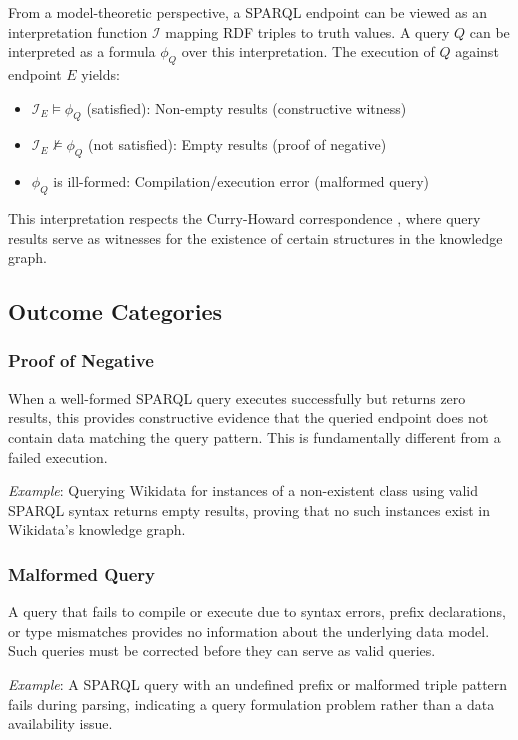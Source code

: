 From a model-theoretic perspective, a SPARQL endpoint can be viewed as an interpretation function $\mathcal{I}$ mapping RDF triples to truth values. A query $Q$ can be interpreted as a formula $\phi_Q$ over this interpretation. The execution of $Q$ against endpoint $E$ yields:

\begin{itemize}
  \item $\mathcal{I}_E \models \phi_Q$ (satisfied): Non-empty results (constructive witness)
  \item $\mathcal{I}_E \not\models \phi_Q$ (not satisfied): Empty results (proof of negative)
  \item $\phi_Q$ is ill-formed: Compilation/execution error (malformed query)
\end{itemize}

This interpretation respects the Curry-Howard correspondence \cite{curyhoward1934, howard1969formulae}, where query results serve as witnesses for the existence of certain structures in the knowledge graph.

\subsection{Outcome Categories}

\subsubsection{Proof of Negative}

When a well-formed SPARQL query executes successfully but returns zero results, this provides constructive evidence that the queried endpoint does not contain data matching the query pattern. This is fundamentally different from a failed execution.

\textit{Example}: Querying Wikidata for instances of a non-existent class using valid SPARQL syntax returns empty results, proving that no such instances exist in Wikidata's knowledge graph.

\subsubsection{Malformed Query}

A query that fails to compile or execute due to syntax errors, prefix declarations, or type mismatches provides no information about the underlying data model. Such queries must be corrected before they can serve as valid queries.

\textit{Example}: A SPARQL query with an undefined prefix or malformed triple pattern fails during parsing, indicating a query formulation problem rather than a data availability issue.

